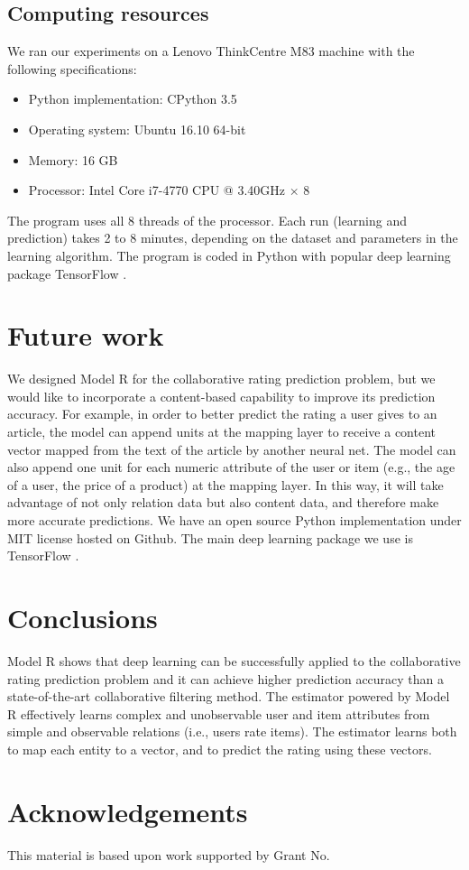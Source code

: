 \documentclass[conference]{IEEEtran}
\begin{document}
\subsection{Computing resources}
We ran our experiments on a Lenovo ThinkCentre M83 machine with the following specifications:
\begin{itemize}
	\item Python implementation: CPython 3.5
	\item Operating system: Ubuntu 16.10 64-bit
	\item Memory: 16 GB
	\item Processor: Intel Core i7-4770 CPU @ 3.40GHz $ \times $ 8
\end{itemize}
The program uses all 8 threads of the processor.
Each run (learning and prediction) takes 2 to 8 minutes,
depending on the dataset and parameters in the learning algorithm.
The program is coded in Python
with popular deep learning package TensorFlow \cite{abadi2016tensorflow}.

\section{Future work}
We designed Model R for the collaborative rating prediction problem,
but we would like to incorporate a content-based capability to improve its 
prediction accuracy.
For example, in order to better predict the rating a user gives to an article,
the model can append units at the mapping layer to receive a content vector 
mapped from the text of the article by another neural net.
The model can also append one unit for each numeric attribute of the user or 
item (e.g., the age of a user, the price of a product) at the mapping layer.
In this way, it will take advantage of not only relation data but also content 
data, and therefore make more accurate predictions.
We have an open source Python implementation under MIT license hosted on Github.
The main deep learning package we use is TensorFlow 
\cite{abadi2016tensorflow}.

\section{Conclusions}
Model R shows that deep learning can be successfully applied to the 
collaborative rating prediction problem
and it can achieve higher prediction accuracy than a state-of-the-art 
collaborative filtering method.
The estimator powered by Model R effectively learns complex and unobservable 
user and item attributes from simple and observable relations (i.e., users rate 
items).
The estimator learns both to map each entity to a vector, and to predict 
the rating using these vectors.

\section*{Acknowledgements}
This material is based upon work supported by Grant No.



\end{document}
